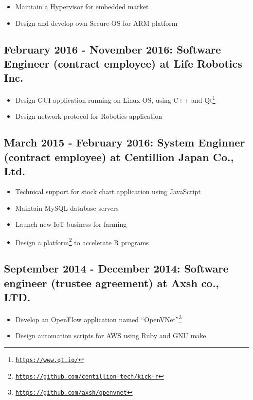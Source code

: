 \documentclass[letterpaper]{article}
\begin{document}
\begin{itemize}
  \item Maintain a Hypervisor for embedded market
  \item Design and develop own Secure-OS for ARM platform
\end{itemize}

\subsection*{February 2016 - November 2016: Software Engineer (contract employee) at Life Robotics Inc.}

\begin{itemize}
  \item Design GUI application running on Linux OS, using C++ and Qt\footnote{\href{https://www.qt.io/}{\tt https://www.qt.io/}}
  \item Design network protocol for Robotics application
\end{itemize}

\subsection*{March 2015 - February 2016: System Enginner (contract employee) at Centillion Japan Co., Ltd.}

\begin{itemize}
  \item Technical support for stock chart application using JavaScript
  \item Maintain MySQL database servers
  \item Launch new IoT business for farming
  \item Design a platform\footnote{\href{https://github.com/centillion-tech/kick-r}{\tt https://github.com/centillion-tech/kick-r}} to accelerate R programs
\end{itemize}

\subsection*{September 2014 - December 2014: Software engineer (trustee agreement) at Axsh co., LTD.}

\begin{itemize}
  \item Develop an OpenFlow application named ``OpenVNet''\footnote{\href{https://github.com/axsh/openvnet}{\tt https://github.com/axsh/openvnet}}
  \item Design automation scripts for AWS using Ruby and GNU make
\end{itemize}
\end{document}
